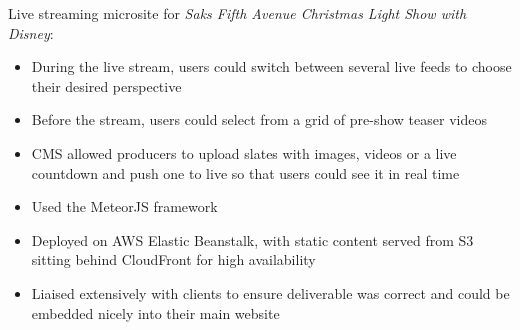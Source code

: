 \item Live streaming microsite for \emph{Saks Fifth Avenue Christmas Light Show with Disney}:
\begin{itemize}%
    \item During the live stream, users could switch between several live feeds to choose their desired perspective
    \item Before the stream, users could select from a grid of pre-show teaser videos
    \item CMS allowed producers to upload slates with images, videos or a live countdown and push one to live so that users could see it in real time
    \item Used the MeteorJS framework
    \item Deployed on AWS Elastic Beanstalk, with static content served from S3 sitting behind CloudFront for high availability
    \item Liaised extensively with clients to ensure deliverable was correct and could be embedded nicely into their main website
\end{itemize}

